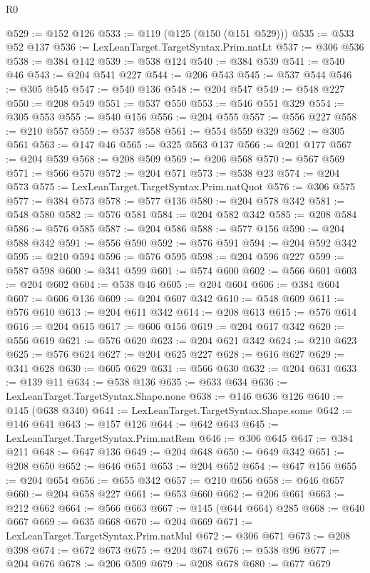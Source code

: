 \begin{lexlean}{R0}
\begin{coremodule}
@529 := @152 @126
@533 := @119 (@125 (@150 (@151 @529)))
@535 := @533 @52 @137
@536 := LexLeanTarget.TargetSyntax.Prim.natLt
@537 := @306 @536
@538 := @384 @142
@539 := @538 @124
@540 := @384 @539
@541 := @540 @46
@543 := @204 @541 @227
@544 := @206 @543
@545 := @537 @544
@546 := @305 @545
@547 := @540 @136
@548 := @204 @547
@549 := @548 @227
@550 := @208 @549
@551 := @537 @550
@553 := @546 @551 @329
@554 := @305 @553
@555 := @540 @156
@556 := @204 @555
@557 := @556 @227
@558 := @210 @557
@559 := @537 @558
@561 := @554 @559 @329
@562 := @305 @561
@563 := @147 @46
@565 := @325 @563 @137
@566 := @201 @177
@567 := @204 @539
@568 := @208 @509
@569 := @206 @568
@570 := @567 @569
@571 := @566 @570
@572 := @204 @571
@573 := @538 @23
@574 := @204 @573
@575 := LexLeanTarget.TargetSyntax.Prim.natQuot
@576 := @306 @575
@577 := @384 @573
@578 := @577 @136
@580 := @204 @578 @342
@581 := @548 @580
@582 := @576 @581
@584 := @204 @582 @342
@585 := @208 @584
@586 := @576 @585
@587 := @204 @586
@588 := @577 @156
@590 := @204 @588 @342
@591 := @556 @590
@592 := @576 @591
@594 := @204 @592 @342
@595 := @210 @594
@596 := @576 @595
@598 := @204 @596 @227
@599 := @587 @598
@600 := @341 @599
@601 := @574 @600
@602 := @566 @601
@603 := @204 @602
@604 := @538 @46
@605 := @204 @604
@606 := @384 @604
@607 := @606 @136
@609 := @204 @607 @342
@610 := @548 @609
@611 := @576 @610
@613 := @204 @611 @342
@614 := @208 @613
@615 := @576 @614
@616 := @204 @615
@617 := @606 @156
@619 := @204 @617 @342
@620 := @556 @619
@621 := @576 @620
@623 := @204 @621 @342
@624 := @210 @623
@625 := @576 @624
@627 := @204 @625 @227
@628 := @616 @627
@629 := @341 @628
@630 := @605 @629
@631 := @566 @630
@632 := @204 @631
@633 := @139 @11
@634 := @538 @136
@635 := @633 @634
@636 := LexLeanTarget.TargetSyntax.Shape.none
@638 := @146 @636 @126
@640 := @145 (@638 @340)
@641 := LexLeanTarget.TargetSyntax.Shape.some
@642 := @146 @641
@643 := @157 @126
@644 := @642 @643
@645 := LexLeanTarget.TargetSyntax.Prim.natRem
@646 := @306 @645
@647 := @384 @211
@648 := @647 @136
@649 := @204 @648
@650 := @649 @342
@651 := @208 @650
@652 := @646 @651
@653 := @204 @652
@654 := @647 @156
@655 := @204 @654
@656 := @655 @342
@657 := @210 @656
@658 := @646 @657
@660 := @204 @658 @227
@661 := @653 @660
@662 := @206 @661
@663 := @212 @662
@664 := @566 @663
@667 := @145 (@644 @664) @285
@668 := @640 @667
@669 := @635 @668
@670 := @204 @669
@671 := LexLeanTarget.TargetSyntax.Prim.natMul
@672 := @306 @671
@673 := @208 @398
@674 := @672 @673
@675 := @204 @674
@676 := @538 @96
@677 := @204 @676
@678 := @206 @509
@679 := @208 @678
@680 := @677 @679

\end{coremodule}
\end{lexlean}
